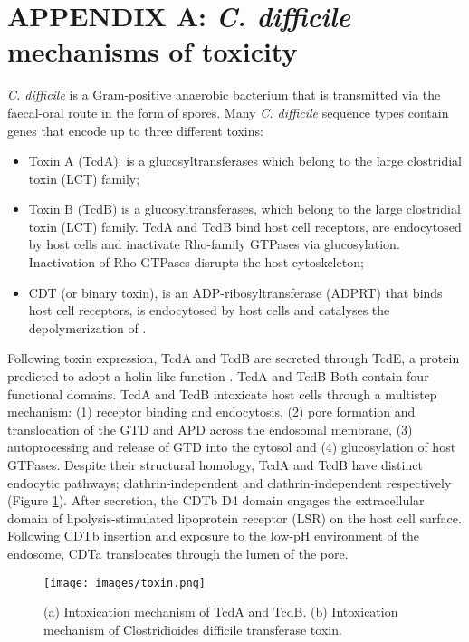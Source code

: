 \documentclass{article}
\begin{document}
\section{APPENDIX A: {\it C. difficile} mechanisms of toxicity}

{\it C. difficile} is a Gram-positive anaerobic bacterium that is transmitted via the faecal-oral route in the form of spores. Many {\it C. difficile} sequence types contain genes that encode up to three different toxins:

\begin{itemize}
\item Toxin A (TcdA). is a glucosyltransferases which belong to the large clostridial toxin (LCT) family;
\item Toxin B (TcdB) is a glucosyltransferases, which belong to the large clostridial toxin (LCT) family. TcdA and TcdB bind host cell receptors, are endocytosed by host cells and inactivate Rho-family GTPases via glucosylation. Inactivation of Rho GTPases disrupts the host cytoskeleton;
\item CDT (or binary toxin), is an ADP-ribosyltransferase (ADPRT) that binds host cell receptors, is endocytosed by host cells and catalyses the depolymerization of \cite{Gerding}.
\end{itemize}

Following toxin expression, TcdA and TcdB are secreted through TcdE, a protein predicted to adopt a holin-like function \cite{Govind}. TcdA and TcdB  Both contain four functional domains. TcdA and TcdB intoxicate host cells through a multistep mechanism: (1) receptor binding and endocytosis, (2) pore formation and translocation of the GTD and APD across the endosomal membrane, (3) autoprocessing and release of GTD into the cytosol and (4) glucosylation of host GTPases.  Despite their structural homology, TcdA and TcdB have distinct endocytic pathways; clathrin-independent and clathrin-independent respectively (Figure \ref{fig:toxin}). After secretion, the CDTb D4 domain engages the extracellular domain of lipolysis-stimulated lipoprotein receptor (LSR) on the host cell surface. Following CDTb insertion and exposure to the low-pH environment of the endosome, CDTa translocates through the lumen of the pore.

\begin{figure}
\centering
\texttt{[image: images/toxin.png]}
\caption{\label{fig:toxin} (a) Intoxication mechanism of TcdA and TcdB. (b) Intoxication mechanism of Clostridioides difficile transferase toxin.}
\end{figure}
\end{document}
